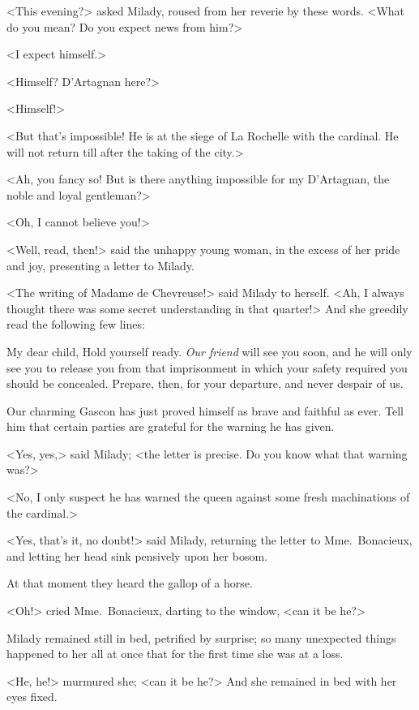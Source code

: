 <This evening?> asked Milady, roused from her reverie by these words. <What do you mean? Do you expect news from him?> 

<I expect himself.> 

<Himself? D'Artagnan here?> 

<Himself!> 

<But that's impossible! He is at the siege of La Rochelle with the cardinal. He will not return till after the taking of the city.> 

<Ah, you fancy so! But is there anything impossible for my D'Artagnan, the noble and loyal gentleman?> 

<Oh, I cannot believe you!> 

<Well, read, then!> said the unhappy young woman, in the excess of her pride and joy, presenting a letter to Milady. 

<The writing of Madame de Chevreuse!> said Milady to herself. <Ah, I always thought there was some secret understanding in that quarter!> And she greedily read the following few lines: 

\begin{mail}{}{My dear child,} 
Hold yourself ready. \emph{Our friend} will see you soon, and he will only see you to release you from that imprisonment in which your safety required you should be concealed. Prepare, then, for your departure, and never despair of us.

Our charming Gascon has just proved himself as brave and faithful as ever. Tell him that certain parties are grateful for the warning he has given. 
\end{mail}

<Yes, yes,> said Milady; <the letter is precise. Do you know what that warning was?> 

<No, I only suspect he has warned the queen against some fresh machinations of the cardinal.> 

<Yes, that's it, no doubt!> said Milady, returning the letter to Mme.~Bonacieux, and letting her head sink pensively upon her bosom. 

At that moment they heard the gallop of a horse. 

<Oh!> cried Mme.~Bonacieux, darting to the window, <can it be he?> 

Milady remained still in bed, petrified by surprise; so many unexpected things happened to her all at once that for the first time she was at a loss. 

<He, he!> murmured she; <can it be he?> And she remained in bed with her eyes fixed. 

